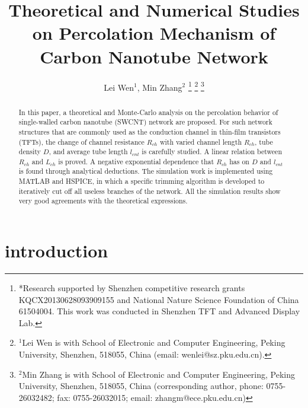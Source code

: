 \documentclass[letterpaper, 10 pt, conference]{ieeeconf}
\title{\LARGE \bf
 Theoretical and Numerical Studies on Percolation Mechanism of Carbon Nanotube Network}
\author{Lei Wen$^1$, Min Zhang$^2$
  \thanks{*Research supported by Shenzhen competitive research grants KQCX20130628093909155 and National Nature Science Foundation of China 61504004. This work was conducted in Shenzhen TFT and Advanced Display Lab.}
  \thanks{$^{1}$Lei Wen is with School of Electronic and Computer Engineering, Peking University, Shenzhen, 518055, China (email: wenlei@sz.pku.edu.cn).}
  \thanks{$^{2}$Min Zhang is with School of Electronic and Computer Engineering, Peking University, Shenzhen, 518055, China (corresponding author, phone: 0755-26032482; fax: 0755-26032015; email: zhangm@ece.pku.edu.cn)}
}
\begin{document}
\maketitle
\thispagestyle{empty}
\pagestyle{empty}

\begin{abstract}
  In this paper, a theoretical and Monte-Carlo analysis on the percolation behavior of single-walled carbon nanotube (SWCNT) network are proposed. For such network structures that are commonly used as the conduction channel in thin-film transistors (TFTs), the change of channel resistance $R_{ch}$ with varied channel length $R_{ch}$, tube density $D$, and average tube length $l_{cnt}$ is carefully studied. A linear relation between $R_{ch}$ and $L_{ch}$ is proved. A negative exponential dependence that $R_{ch}$ has on $D$ and $l_{cnt}$ is found through analytical deductions. The simulation work is implemented using MATLAB and HSPICE, in which a specific trimming algorithm is developed to iteratively cut off all useless branches of the network. All the simulation results show very good agreements with the theoretical expressions.
\end{abstract}

\section{introduction}
\end{document}
